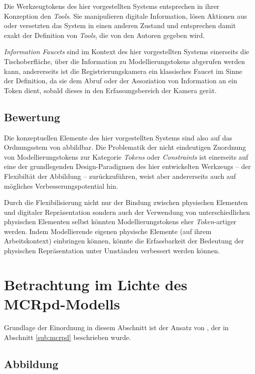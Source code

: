 Die Werkzeugtokens des hier vorgestellten Systems entsprechen in ihrer Konzeption den \emph{Tools}. Sie manipulieren digitale Information, lösen Aktionen aus oder versetzten das System in einen anderen Zustand und entsprechen damit exakt der Definition von \emph{Tools}, die von den Autoren gegeben wird.

\emph{Information Faucets} sind im Kontext des hier vorgestellten Systems einerseits die Tischoberfläche, über die Information zu Modellierungstokens abgerufen werden kann, andererseits ist die Registrierungskamera ein klassisches Faucet im Sinne der Definition, da sie dem Abruf oder der Assoziation von Information an ein Token dient, sobald dieses in den Erfassungsbereich der Kamera gerät.

\subsection{Bewertung}

Die konzeptuellen Elemente des hier vorgestellten Systems sind also auf das Ordnungsstem von \citet{Holmquist99} abbildbar. Die Problematik der nicht eindeutigen Zuordnung von Modellierungstokens zur Kategorie \emph{Tokens} oder \emph{Constraints} ist einerseits auf eine der grundlegenden Design-Paradigmen des hier entwickelten Werkzeugs -- der Flexibiltät der Abbildung -- zurückzuführen, weist aber andererseits auch auf mögliches Verbesserungspotential hin.

Durch die Flexibilisierung nicht nur der Bindung zwischen physischen Elementen und digitaler Repräsentation sondern auch der Verwendung von unterschiedlichen physischen Elementen selbst könnten Modellierungstokens eher \emph{Token}-artiger werden. Indem Modellierende eigenen physische Elemente (auf ihrem Arbeitskontext) einbringen können, könnte die Erfassbarkeit der Bedeutung der physischen Repräsentation unter Umständen verbessert werden können.

\section{Betrachtung im Lichte des MCRpd-Modells} %
\label{sec:betrachtung_im_lichte_des_mcrpd_modells}

Grundlage der Einordnung in diesem Abschnitt ist der Ansatz von \citet{Ullmer00}, der in Abschnitt \ref{sub:mcrpd} beschrieben wurde.

\subsection{Abbildung}

